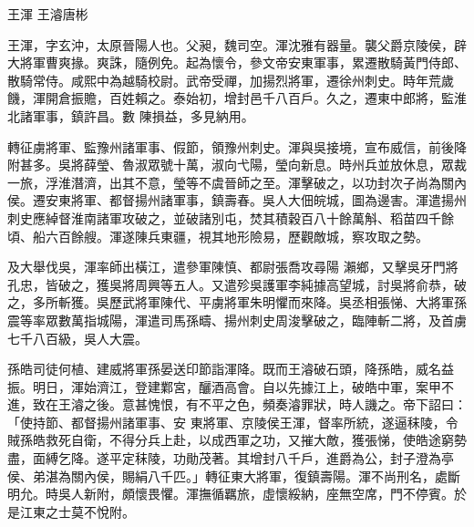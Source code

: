 
\begin{pinyinscope}
王渾
 王濬唐彬



 王渾，字玄沖，太原晉陽人也。父昶，魏司空。渾沈雅有器量。襲父爵京陵侯，辟大將軍曹爽掾。爽誅，隨例免。起為懷令，參文帝安東軍事，累遷散騎黃門侍郎、散騎常侍。咸熙中為越騎校尉。武帝受禪，加揚烈將軍，遷徐州刺史。時年荒歲饑，渾開倉振贍，百姓賴之。泰始初，增封邑千八百戶。久之，遷東中郎將，監淮北諸軍事，鎮許昌。數
 陳損益，多見納用。



 轉征虜將軍、監豫州諸軍事、假節，領豫州刺史。渾與吳接境，宣布威信，前後降附甚多。吳將薛瑩、魯淑眾號十萬，淑向弋陽，瑩向新息。時州兵並放休息，眾裁一旅，浮淮潛濟，出其不意，瑩等不虞晉師之至。渾擊破之，以功封次子尚為關內侯。遷安東將軍、都督揚州諸軍事，鎮壽春。吳人大佃皖城，圖為邊害。渾遣揚州刺史應綽督淮南諸軍攻破之，並破諸別屯，焚其積穀百八十餘萬斛、稻苗四千餘頃、船六百餘艘。渾遂陳兵東疆，視其地形險易，歷觀敵城，察攻取之勢。



 及大舉伐吳，渾率師出橫江，遣參軍陳慎、都尉張喬攻尋陽
 瀨鄉，又擊吳牙門將孔忠，皆破之，獲吳將周興等五人。又遣殄吳護軍李純據高望城，討吳將俞恭，破之，多所斬獲。吳歷武將軍陳代、平虜將軍朱明懼而來降。吳丞相張悌、大將軍孫震等率眾數萬指城陽，渾遣司馬孫疇、揚州刺史周浚擊破之，臨陣斬二將，及首虜七千八百級，吳人大震。



 孫皓司徒何植、建威將軍孫晏送印節詣渾降。既而王濬破石頭，降孫皓，威名益振。明日，渾始濟江，登建鄴宮，釃酒高會。自以先據江上，破皓中軍，案甲不進，致在王濬之後。意甚愧恨，有不平之色，頻奏濬罪狀，時人譏之。帝下詔曰：「使持節、都督揚州諸軍事、安
 東將軍、京陵侯王渾，督率所統，遂逼秣陵，令賊孫皓救死自衛，不得分兵上赴，以成西軍之功，又摧大敵，獲張悌，使皓途窮勢盡，面縛乞降。遂平定秣陵，功勛茂著。其增封八千戶，進爵為公，封子澄為亭侯、弟湛為關內侯，賜絹八千匹。」轉征東大將軍，復鎮壽陽。渾不尚刑名，處斷明允。時吳人新附，頗懷畏懼。渾撫循羈旅，虛懷綏納，座無空席，門不停賓。於是江東之士莫不悅附。




\end{pinyinscope}
